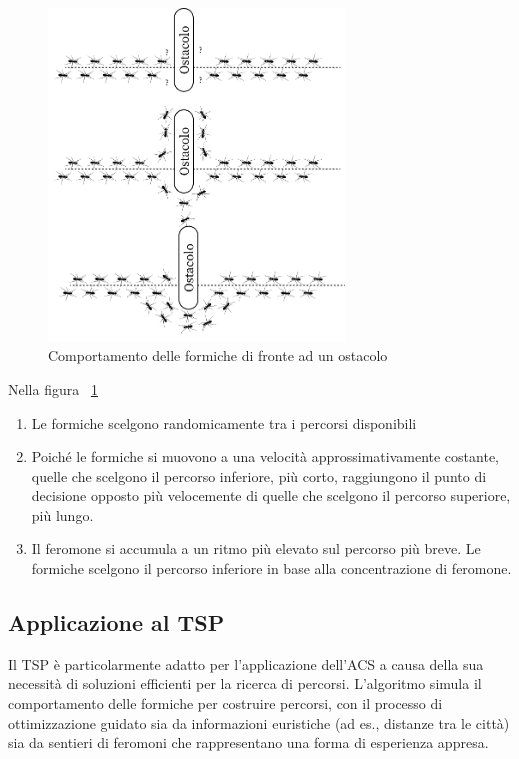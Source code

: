 \begin{figure}[]
	\centering
	\includegraphics[width=0.7\textwidth]{Chapters/Figures/ants_path.png}
	\caption{Comportamento delle formiche di fronte ad un ostacolo}
	\label{fig:obstacle}
\end{figure}

Nella figura ~\ref{fig:obstacle}
\begin{enumerate}
	\item Le formiche scelgono randomicamente tra i percorsi disponibili
	\item Poiché le formiche si muovono a una velocità approssimativamente costante, quelle che scelgono il percorso inferiore, più corto, raggiungono il punto di decisione opposto più velocemente di quelle che scelgono il percorso superiore, più lungo.
	\item  Il feromone si accumula a un ritmo più elevato sul percorso più breve. Le formiche scelgono il percorso inferiore in base alla concentrazione di feromone.
\end{enumerate}


\subsection{Applicazione al \Gls{TSP}}
Il \Gls{TSP} è particolarmente adatto per l'applicazione dell'\Gls{ACS} a causa della sua necessità di soluzioni efficienti per la ricerca di percorsi. L'algoritmo simula il comportamento delle formiche per costruire percorsi, con il processo di ottimizzazione guidato sia da informazioni euristiche (ad es., distanze tra le città) sia da sentieri di feromoni che rappresentano una forma di esperienza appresa\cite{Dorigo1997, Gambardella1995}.

